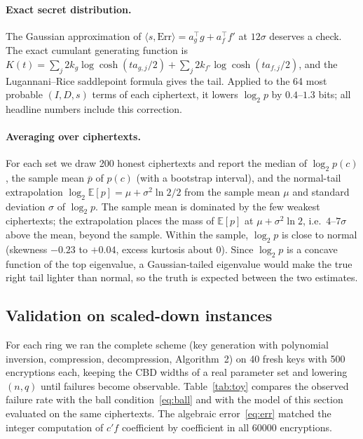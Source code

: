 \documentclass[11pt,a4paper]{article}
\theoremstyle{definition}
\theoremstyle{remark}
\newcommand{\Err}{\mathrm{Err}}
\newcommand{\E}{\mathbb{E}}
\begin{document}
\paragraph{Exact secret distribution.}
The Gaussian approximation of $\langle s,\Err\rangle=a_g^\top g+a_f^\top f'$
at $12\sigma$ deserves a check. The exact cumulant generating function is
$K(t)=\sum_j 2k_g\log\cosh(t a_{g,j}/2)+\sum_j 2k_{f'}\log\cosh(t a_{f,j}/2)$,
and the Lugannani--Rice saddlepoint formula gives the tail. Applied to the
64 most probable $(I,D,s)$ terms of each ciphertext, it lowers $\log_2 p$ by
$0.4$--$1.3$ bits; all headline numbers include this correction.

\paragraph{Averaging over ciphertexts.}
For each set we draw 200 honest ciphertexts and report the median of
$\log_2 p(c)$, the sample mean $\overline{p}$ of $p(c)$ (with a bootstrap
interval), and the normal-tail extrapolation
$\log_2\E[p]=\mu+\sigma^2\ln2/2$ from the sample mean $\mu$ and standard
deviation $\sigma$ of $\log_2 p$. The sample mean is dominated by the few
weakest ciphertexts; the extrapolation places the mass of $\E[p]$ at
$\mu+\sigma^2\ln 2$, i.e.\ $4$--$7\sigma$ above the mean, beyond the sample.
Within the sample, $\log_2 p$ is close to normal (skewness $-0.23$ to
$+0.04$, excess kurtosis about $0$). Since $\log_2 p$ is a concave function
of the top eigenvalue, a Gaussian-tailed eigenvalue would make the true
right tail lighter than normal, so the truth is expected between the two
estimates.

\subsection{Validation on scaled-down instances}
\label{sec:toy}

For each ring we ran the complete scheme (key generation with polynomial
inversion, compression, decompression, Algorithm~2) on 40 fresh keys with
500 encryptions each, keeping the CBD widths of a real parameter set and
lowering $(n,q)$ until failures become observable. Table~\ref{tab:toy}
compares the observed failure rate with the ball condition~\eqref{eq:ball}
and with the model of this section evaluated on the same ciphertexts.
The algebraic error~\eqref{eq:err} matched the integer computation of $c'f$
coefficient by coefficient in all $60000$ encryptions.
\end{document}
